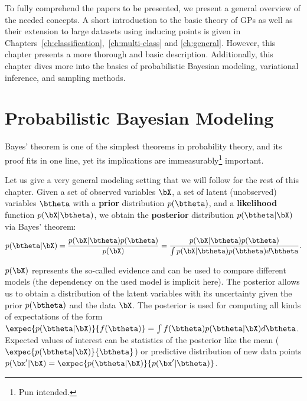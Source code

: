 


\graphicspath{{2_background/figures/}}

To fully comprehend the papers to be presented, we present a general overview of the needed concepts.
A short introduction to the basic theory of \aclp{GP} as well as their extension to large datasets using inducing points \cite{Titsias2009} is given in Chapters~\ref{ch:classification},~\ref{ch:multi-class} and \ref{ch:general}.
However, this chapter presents a more thorough and basic description.
Additionally, this chapter dives more into the basics of probabilistic Bayesian modeling, variational inference, and sampling methods.

\section{Probabilistic Bayesian Modeling}

\label{sec:prob_bayes}

Bayes' theorem is one of the simplest theorems in probability theory, and its proof fits in one line, yet its implications are immeasurably\footnote{Pun intended.} important.

Let us give a very general modeling setting that we will follow for the rest of this chapter.
Given a set of observed variables $\bX$, a set of latent (unobserved) variables $\btheta$ with a \textbf{prior} distribution $p(\btheta)$, and a \textbf{likelihood} function $p(\bX|\btheta)$, we obtain the \textbf{posterior} distribution $p(\btheta|\bX)$ via Bayes' theorem:
\begin{align}
p(\btheta|\bX) = \frac{p(\bX|\btheta)p(\btheta)}{p(\bX)} = \frac{p(\bX|\btheta)p(\btheta)}{\int p(\bX|\btheta)p(\btheta)d\btheta}.
\label{eq:bayes}
\end{align}

$p(\bX)$ represents the so-called evidence and can be used to compare different models (the dependency on the used model is implicit here).
The posterior allows us to obtain a distribution of the latent variables with its uncertainty given the prior $p(\btheta)$ and the data $\bX$.
The posterior is used for computing all kinds of expectations of the form $\expec{p(\btheta|\bX)}{f(\btheta)} = \int f(\btheta)p(\btheta|\bX)d\btheta$.
Expected values of interest can be statistics of the posterior like the mean ($\expec{p(\btheta|\bX)}{\btheta}$) or predictive distribution of new data points $p(\bx'|\bX) = \expec{p(\btheta|\bX)}{p(\bx'|\btheta)}$.

